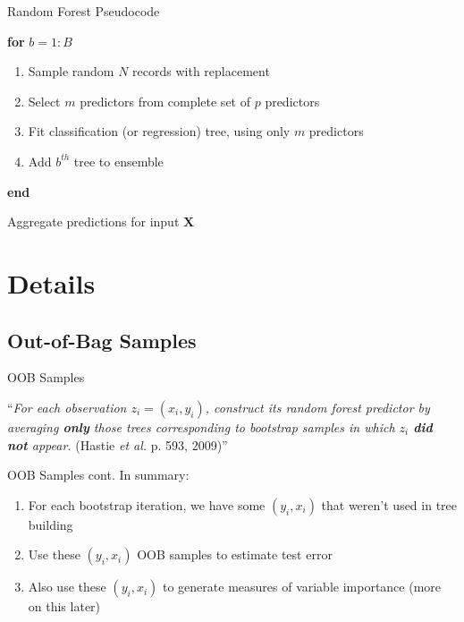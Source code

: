 \documentclass[pdf]{beamer}
\begin{document}
	\begin{frame}{Random Forest Pseudocode}
		\begin{enumerate}[]
			{\selectfont
			\item{\textbf{for} $b = 1:B$}
				\begin{enumerate}[  ]
					\item{\hspace{3 mm} Sample random $N$ records with replacement}
					\item{\hspace{3 mm} Select $m$ predictors from complete set of $p$ predictors}
					\item{\hspace{3 mm} Fit classification (or regression) tree, using only $m$ predictors}
					\item{\hspace{3 mm} Add $b^{th}$ tree to ensemble}
				\end{enumerate}
			\item{\textbf{end}}
			\item{Aggregate predictions for input $\textbf{X}$}
			}
		\end{enumerate}
	\end{frame}
	

\section{Details}
	\subsection{Out-of-Bag Samples}
		\begin{frame}{OOB Samples}
		
			{\selectfont
			``\textit{For each observation $z_i = (x_i, y_i)$, construct its random forest predictor by averaging \textbf{only} those trees corresponding to bootstrap samples in which $z_i$ \textbf{did not} appear.} (Hastie \textit{et al.} p. 593, 2009)''
			}
		\end{frame}
		
		\begin{frame} {OOB Samples cont.}
		In summary: \\
			\begin{enumerate}
				\item For each bootstrap iteration, we have some $(y_i, x_i)$  that weren't used in tree building
				\item Use these $(y_i, x_i)$ OOB samples to estimate test error
				\item Also use these $(y_i, x_i)$ to generate measures of variable importance (more on this later)
			\end{enumerate}
		\end{frame}
		
\end{document}
